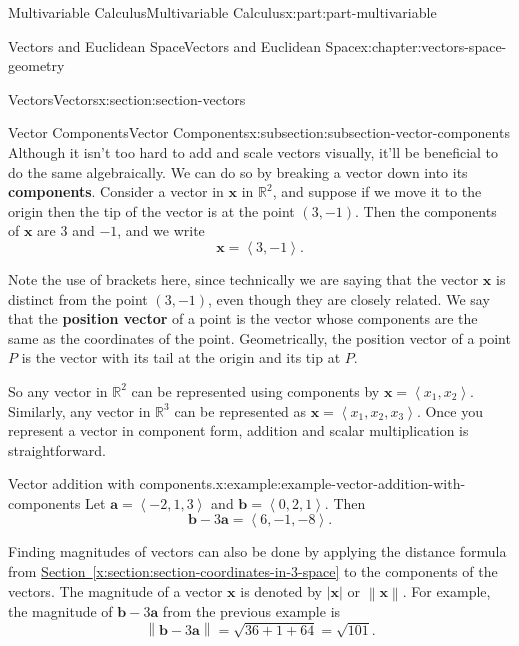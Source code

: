 \documentclass[twoside,10pt,]{tufte-book}
\newcommand{\xreffont}{\relax}
\newcommand{\terminology}[1]{\textbf{#1}}
\numberwithin{equation}{part}
\newcommand{\RR}{\mathbb{R}}
\newcommand{\norm}[1]{\left\| #1 \right\|}
\newcommand{\dotprod}[1]{\left\langle #1 \right\rangle}
\begin{document}
\begin{partptx}{Multivariable Calculus}{}{Multivariable Calculus}{}{}{x:part:part-multivariable}
\begin{chapterptx}{Vectors and Euclidean Space}{}{Vectors and Euclidean Space}{}{}{x:chapter:vectors-space-geometry}
\begin{sectionptx}{Vectors}{}{Vectors}{}{}{x:section:section-vectors}
%
\begin{subsectionptx}{Vector Components}{}{Vector Components}{}{}{x:subsection:subsection-vector-components}
Although it isn't too hard to add and scale vectors visually, it'll be beneficial to do the same algebraically. We can do so by breaking a vector down into its \terminology{components}. Consider a vector in \(\mathbf{x}\) in \(\RR^{2}\), and suppose if we move it to the origin then the tip of the vector is at the point \((3,-1)\). Then the components of \(\mathbf{x}\) are \(3\) and \(-1\), and we write%
\begin{equation*}
\mathbf{x} = \dotprod{3,-1}.
\end{equation*}
%
\par
Note the use of brackets here, since technically we are saying that the vector \(\mathbf{x}\) is distinct from the point \((3,-1)\), even though they are closely related. We say that the \terminology{position vector} of a point is the vector whose components are the same as the coordinates of the point. Geometrically, the position vector of a point \(P\) is the vector with its tail at the origin and its tip at \(P\).%
\par
So any vector in \(\RR^{2}\) can be represented using components by \(\mathbf{x} = \dotprod{x_{1},x_{2}}\). Similarly, any vector in \(\RR^{3}\) can be represented as \(\mathbf{x} = \dotprod{x_{1},x_{2},x_{3}}\). Once you represent a vector in component form, addition and scalar multiplication is straightforward.%
\begin{example}{Vector addition with components.}{x:example:example-vector-addition-with-components}%
Let \(\mathbf{a} = \dotprod{-2,1,3}\) and \(\mathbf{b} = \dotprod{0,2,1}\). Then%
%
\begin{equation*}
\mathbf{b}-3\mathbf{a} = \dotprod{6,-1,-8}.
\end{equation*}
\end{example}
Finding magnitudes of vectors can also be done by applying the distance formula from \hyperref[x:section:section-coordinates-in-3-space]{Section~{\xreffont\ref{x:section:section-coordinates-in-3-space}}} to the components of the vectors. The magnitude of a vector \(\mathbf{x}\) is denoted by \(|\mathbf{x}|\) or \(\norm{\mathbf{x}}\). For example, the magnitude of \(\mathbf{b}-3\mathbf{a}\) from the previous example is%
\begin{equation*}
\norm{\mathbf{b}-3\mathbf{a}} = \sqrt{36+1+64} = \sqrt{101}.
\end{equation*}
%
\par

\end{subsectionptx}
\end{sectionptx}
\end{chapterptx}
\end{partptx}
\end{document}
